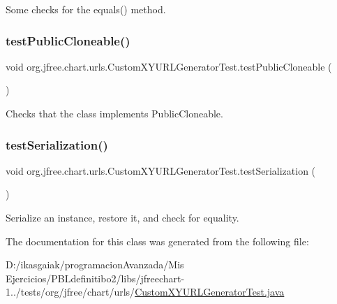 Some checks for the equals() method. \mbox{\label{classorg_1_1jfree_1_1chart_1_1urls_1_1_custom_x_y_u_r_l_generator_test_abb71096c1a31cca9fde9e6cfaa71224c}} 
\subsubsection{\texorpdfstring{test\+Public\+Cloneable()}{testPublicCloneable()}}
{\footnotesize\ttfamily void org.\+jfree.\+chart.\+urls.\+Custom\+X\+Y\+U\+R\+L\+Generator\+Test.\+test\+Public\+Cloneable (\begin{DoxyParamCaption}{ }\end{DoxyParamCaption})}

Checks that the class implements Public\+Cloneable. \mbox{\label{classorg_1_1jfree_1_1chart_1_1urls_1_1_custom_x_y_u_r_l_generator_test_a261684647d9c7e268425b9cedc213813}} 
\subsubsection{\texorpdfstring{test\+Serialization()}{testSerialization()}}
{\footnotesize\ttfamily void org.\+jfree.\+chart.\+urls.\+Custom\+X\+Y\+U\+R\+L\+Generator\+Test.\+test\+Serialization (\begin{DoxyParamCaption}{ }\end{DoxyParamCaption})}

Serialize an instance, restore it, and check for equality. 

The documentation for this class was generated from the following file\+:\begin{DoxyCompactItemize}
\item 
D\+:/ikasgaiak/programacion\+Avanzada/\+Mis Ejercicios/\+P\+B\+Ldefinitibo2/libs/jfreechart-\/1../tests/org/jfree/chart/urls/\mbox{\hyperlink{_custom_x_y_u_r_l_generator_test_8java}{Custom\+X\+Y\+U\+R\+L\+Generator\+Test.\+java}}\end{DoxyCompactItemize}
